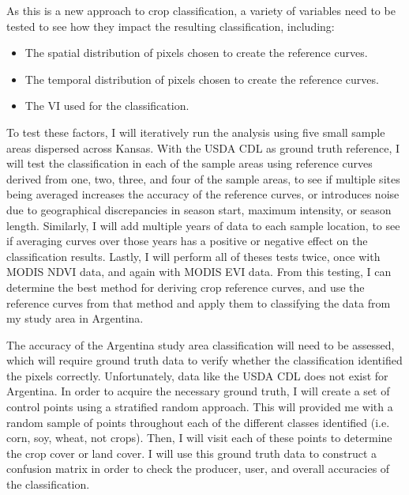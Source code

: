 As this is a new approach to crop classification, a variety of variables need to be tested to see how they impact the resulting classification, including:
\begin{itemize}
  \item The spatial distribution of pixels chosen to create the reference curves.
  \item The temporal distribution of pixels chosen to create the reference curves.
  \item The VI used for the classification.
\end{itemize}
To test these factors, I will iteratively run the analysis using five small sample areas dispersed across Kansas. With the USDA CDL as ground truth reference, I will test the classification in each of the sample areas using reference curves derived from one, two, three, and four of the sample areas, to see if multiple sites being averaged increases the accuracy of the reference curves, or introduces noise due to geographical discrepancies in season start, maximum intensity, or season length. Similarly, I will add multiple years of data to each sample location, to see if averaging curves over those years has a positive or negative effect on the classification results. Lastly, I will perform all of theses tests twice, once with MODIS NDVI data, and again with MODIS EVI data. From this testing, I can determine the best method for deriving crop reference curves, and use the reference curves from that method and apply them to classifying the data from my study area in Argentina.

The accuracy of the Argentina study area classification will need to be assessed, which will require ground truth data to verify whether the classification identified the pixels correctly. Unfortunately, data like the USDA CDL does not exist for Argentina. In order to acquire the necessary ground truth, I will create a set of control points using a stratified random approach. This will provided me with a random sample of points throughout each of the different classes identified (i.e. corn, soy, wheat, not crops). Then, I will visit each of these points to determine the crop cover or land cover. I will use this ground truth data to construct a confusion matrix in order to check the producer, user, and overall accuracies of the classification.
